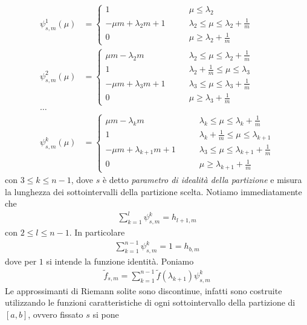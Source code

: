 \documentclass{article}
\numberwithin{equation}{subsection}
\begin{document}
\begin{align*}
    \psi^1_{s, m}(\mu) &= \begin{cases}
        1 \qquad &\mu \leq \lambda_2 \\
        -\mu m + \lambda_2 m + 1 \qquad &\lambda_2 \leq \mu \leq \lambda_2 + \frac{1}{m} \\
        0 \qquad &\mu \geq \lambda_2 + \frac{1}{m}
    \end{cases} \\
    \psi^2_{s, m}(\mu) &= \begin{cases}
        \mu m - \lambda_2 m \qquad &\lambda_2 \leq \mu \leq \lambda_2 + \frac{1}{m} \\
        1 \qquad &\lambda_2 + \frac{1}{m} \leq \mu \leq \lambda_3 \\
        -\mu m + \lambda_3 m + 1 \qquad &\lambda_3 \leq \mu \leq \lambda_3 + \frac{1}{m} \\
        0 \qquad &\mu \geq \lambda_3 + \frac{1}{m}
    \end{cases} \\
    \dots \\
    \psi^k_{s, m}(\mu) &= \begin{cases}
        \mu m - \lambda_k m \qquad &\lambda_k \leq \mu \leq \lambda_k + \frac{1}{m} \\
        1 \qquad &\lambda_k + \frac{1}{m} \leq \mu \leq \lambda_{k + 1} \\
        -\mu m + \lambda_{k + 1} m + 1 \qquad &\lambda_3 \leq \mu \leq \lambda_{k + 1} + \frac{1}{m} \\
        0 \qquad &\mu \geq \lambda_{k + 1} + \frac{1}{m}
    \end{cases}
\end{align*}
con $3 \leq k \leq n - 1$, dove $s$ è detto \textit{parametro di idealità della partizione} e misura la lunghezza dei sottointervalli della partizione scelta. Notiamo immediatamente che 
\begin{align*}
    \sum_{k = 1}^{l}\psi^k_{s, m} = h_{l + 1, m}
\end{align*}
con $2 \leq l \leq n - 1$. In particolare 
\begin{align*}
    \sum_{k = 1}^{n - 1}\psi^k_{s, m} = 1 = h_{b, m} 
\end{align*}
dove per $1$ si intende la funzione identità. Poniamo 
\begin{align*}
    \widetilde{f}_{s, m} = \sum_{k = 1}^{n - 1}\widetilde{f}(\lambda_{k + 1})\psi^k_{s, m}
\end{align*}
Le approssimanti di Riemann solite sono discontinue, infatti sono costruite utilizzando le funzioni caratteristiche di ogni sottointervallo della partizione di $[a, b]$, ovvero fissato $s$ si pone
\end{document}
